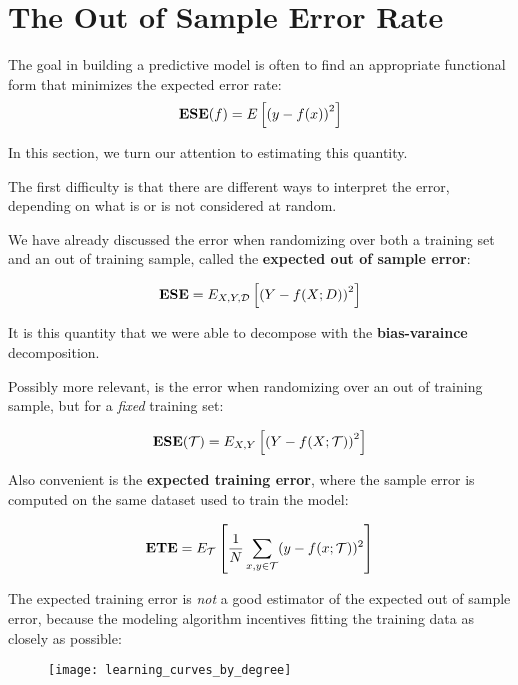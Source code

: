 \section{The Out of Sample Error Rate}
%
%
\begin{frame}
  The goal in building a predictive model is often to find an
  appropriate functional form that minimizes the expected error
  rate:
  $$\operatorname*{\mathbf{ESE}}(f) = E \left[ \left( y - f(x) \right)^2 \right]$$
\end{frame}
%
%
\begin{frame}
  In this section, we turn our attention to estimating this quantity.
\end{frame}
%
%
\begin{frame}
  The first difficulty is that there are different ways to interpret the error,
  depending on what is or is not considered at random.
\end{frame}
%
%
\begin{frame}
  We have already discussed the error when randomizing over both a training set
  and an out of training sample, called the \textbf{expected out of sample
  error}:

  $$\operatorname*{\mathbf{ESE}} = E_{X,Y,\operatorname*{\mathcal{D}}} \left[ \left( Y - f(X; D) \right)^2 \right]$$

  It is this quantity that we were able to decompose with the
  \textbf{bias-varaince} decomposition.
\end{frame}
%
%
\begin{frame}
  Possibly more relevant, is the error when randomizing over an out of training
  sample, but for a \textit{fixed} training set:

  $$\operatorname*{\mathbf{ESE}}(\operatorname*{\mathcal{T}}) = E_{X,Y} \left[ \left( Y - f(X; \operatorname*{\mathcal{T}}) \right)^2 \right]$$
\end{frame}
%
%
\begin{frame}
  Also convenient is the \textbf{expected training error}, where the sample error is
  computed on the same dataset used to train the model:

  $$\operatorname*{\mathbf{ETE}} = E_{\operatorname*{\mathcal{T}}} \left[ \frac{1}{N} \sum_{x,y \in \operatorname*{\mathcal{T}}} (y - f(x; \operatorname*{\mathcal{T}}))^2 \right] $$
\end{frame}
%
%
\begin{frame}
  The expected training error is \textit{not} a good estimator of the expected
  out of sample error, because the modeling algorithm incentives fitting the
  training data as closely as possible:
  \begin{figure}
    \texttt{[image: learning\_curves\_by\_degree]}
  \end{figure}
\end{frame}
